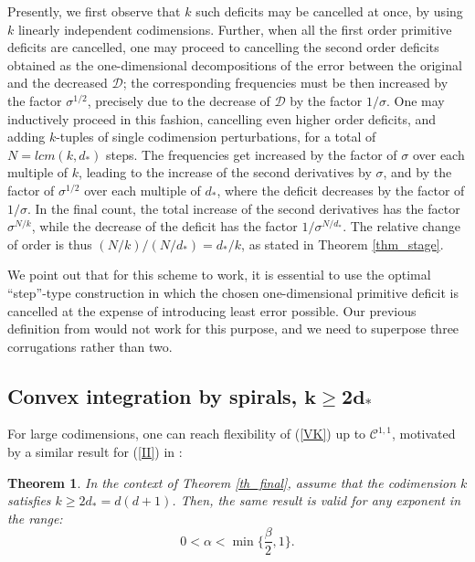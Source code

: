 \documentclass[reqno,twoside,11pt]{amsart}
\numberwithin{equation}{section}
\theoremstyle{plain}
\newtheorem{theorem}{Theorem}[section]
\theoremstyle{definition}
\begin{document}
\medskip

\noindent Presently, we first observe that $k$ such
deficits may be cancelled at once, by using $k$ linearly independent
codimensions. Further, when all the first order primitive deficits are
cancelled, one may proceed to cancelling the second order deficits
obtained as the one-dimensional decompositions of the error between the
original and the decreased $\mathcal{D}$; the corresponding
frequencies must be then increased by the factor $\sigma^{1/2}$,
precisely due to the decrease of $\mathcal{D}$ by the factor
$1/\sigma$. One may inductively proceed in this fashion,
cancelling even higher order deficits, and adding $k$-tuples of single
codimension perturbations, for a total of
$N=lcm(k, d_*)$ steps. The frequencies get increased by the factor of $\sigma$ over each multiple
of $k$, leading to the increase of the second derivatives by $\sigma$, 
and by the factor of $\sigma^{1/2}$ over each multiple of $d_*$,
where the deficit decreases by the factor of $1/\sigma$. In the final count,
the total increase of the second derivatives has the factor
$\sigma^{N/k}$, while the decrease of the deficit has the factor $1/\sigma^{N/d_*}$. The relative
change of order is thus $(N/k) / (N/d_*) = d_*/k$, as stated in Theorem \ref{thm_stage}.

\medskip

\noindent We point out that for this scheme to work, it is essential to
use the optimal ``step''-type construction in which the chosen
one-dimensional primitive deficit is cancelled at the expense of
introducing least error possible. Our previous definition from
\cite{lewpak_MA} would not work for this purpose, and we need to
superpose three corrugations rather than two.


\subsection{Convex integration by spirals, $\mathbf{k\geq 2d_*}$}
For large codimensions, one can reach flexi\-bility of (\ref{VK}) up to $\mathcal{C}^{1,1}$,
motivated by a similar result for (\ref{II}) in \cite{Kallen}:

\begin{theorem}\label{th_finalK}
In the context of Theorem \ref{th_final}, assume that the codimension
$k$ satisfies $k\geq 2d_*=d(d+1)$. Then, the same result is valid for any exponent in the range:
$$ 0<\alpha<\min\Big\{\frac{\beta}{2},1\Big\}.$$
\end{theorem}
\end{document}
